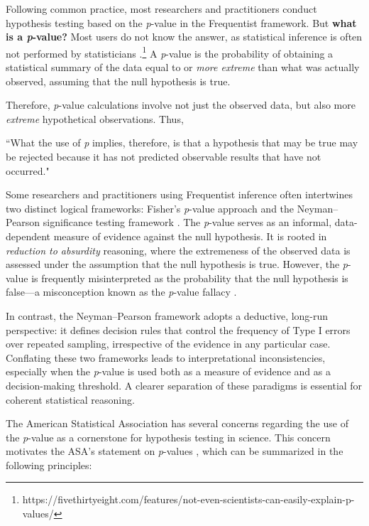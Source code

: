 Following common practice, most researchers and practitioners conduct hypothesis testing based on the \textit{p}-value in the Frequentist framework. But \textbf{what is a \textit{p}-value?} Most users do not know the answer, as statistical inference is often not performed by statisticians \cite{Berger2006}.\footnote{https://fivethirtyeight.com/features/not-even-scientists-can-easily-explain-p-values/} A \textit{p}-value is the probability of obtaining a statistical summary of the data equal to or \textit{more extreme} than what was actually observed, assuming that the null hypothesis is true.

Therefore, \textit{p}-value calculations involve not just the observed data, but also more \textit{extreme} hypothetical observations. Thus,

``What the use of \textit{p} implies, therefore, is that a hypothesis that may be true may be rejected because it has not predicted observable results that have not occurred." \cite{Jeffreys1961}

Some researchers and practitioners using Frequentist inference often intertwines two distinct logical frameworks: Fisher’s \textit{p}-value approach \cite{Fisher1958} and the Neyman--Pearson significance testing framework \cite{Neyman1933}. The \textit{p}-value serves as an informal, data-dependent measure of evidence against the null hypothesis. It is rooted in \textit{reduction to absurdity} reasoning, where the extremeness of the observed data is assessed under the assumption that the null hypothesis is true. However, the \textit{p}-value is frequently misinterpreted as the probability that the null hypothesis is false—a misconception known as the \textit{p}-value fallacy \cite{Goodman1999}. 

In contrast, the Neyman--Pearson framework adopts a deductive, long-run perspective: it defines decision rules that control the frequency of Type I errors over repeated sampling, irrespective of the evidence in any particular case. Conflating these two frameworks leads to interpretational inconsistencies, especially when the \textit{p}-value is used both as a measure of evidence and as a decision-making threshold. A clearer separation of these paradigms is essential for coherent statistical reasoning.

The American Statistical Association has several concerns regarding the use of the \textit{p}-value as a cornerstone for hypothesis testing in science. This concern motivates the ASA's statement on \textit{p}-values \cite{Wasserstein2016}, which can be summarized in the following principles:

